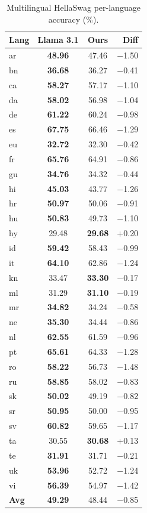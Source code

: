 \documentclass[11pt]{article}
\begin{document}
\begin{table}[h]
\centering
\small
\setlength{\tabcolsep}{3pt}
\begin{tabular}{lccr}
\hline
\textbf{Lang} & \textbf{Llama 3.1} & \textbf{Ours} & \textbf{Diff} \\
\hline
ar & \textbf{48.96} & 47.46 & $-$1.50 \\
bn & \textbf{36.68} & 36.27 & $-$0.41 \\
ca & \textbf{58.27} & 57.17 & $-$1.10 \\
da & \textbf{58.02} & 56.98 & $-$1.04 \\
de & \textbf{61.22} & 60.24 & $-$0.98 \\
es & \textbf{67.75} & 66.46 & $-$1.29 \\
eu & \textbf{32.72} & 32.30 & $-$0.42 \\
fr & \textbf{65.76} & 64.91 & $-$0.86 \\
gu & \textbf{34.76} & 34.32 & $-$0.44 \\
hi & \textbf{45.03} & 43.77 & $-$1.26 \\
hr & \textbf{50.97} & 50.06 & $-$0.91 \\
hu & \textbf{50.83} & 49.73 & $-$1.10 \\
hy & 29.48 & \textbf{29.68} & +0.20 \\
id & \textbf{59.42} & 58.43 & $-$0.99 \\
it & \textbf{64.10} & 62.86 & $-$1.24 \\
kn & 33.47 & \textbf{33.30} & $-$0.17 \\
ml & 31.29 & \textbf{31.10} & $-$0.19 \\
mr & \textbf{34.82} & 34.24 & $-$0.58 \\
ne & \textbf{35.30} & 34.44 & $-$0.86 \\
nl & \textbf{62.55} & 61.59 & $-$0.96 \\
pt & \textbf{65.61} & 64.33 & $-$1.28 \\
ro & \textbf{58.22} & 56.73 & $-$1.48 \\
ru & \textbf{58.85} & 58.02 & $-$0.83 \\
sk & \textbf{50.02} & 49.19 & $-$0.82 \\
sr & \textbf{50.95} & 50.00 & $-$0.95 \\
sv & \textbf{60.82} & 59.65 & $-$1.17 \\
ta & 30.55 & \textbf{30.68} & +0.13 \\
te & \textbf{31.91} & 31.71 & $-$0.21 \\
uk & \textbf{53.96} & 52.72 & $-$1.24 \\
vi & \textbf{56.39} & 54.97 & $-$1.42 \\
\hline
\textbf{Avg} & \textbf{49.29} & 48.44 & $-$0.85 \\
\hline
\end{tabular}
\caption{Multilingual HellaSwag per-language accuracy (\%).}
\label{tab:hellaswag_full}
\end{table}
\end{document}
